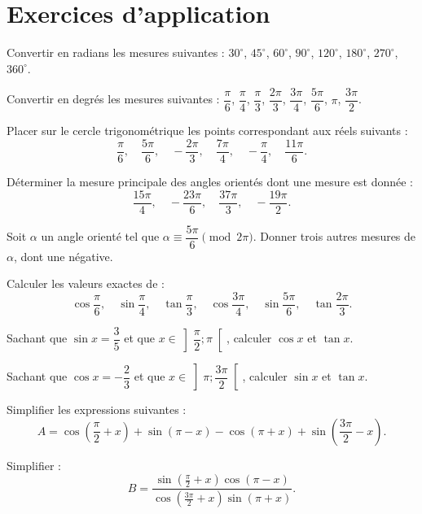 \section{Exercices d'application}


\exo{}
Convertir en radians les mesures suivantes : $30^\circ$, $45^\circ$, $60^\circ$, $90^\circ$, $120^\circ$, $180^\circ$, $270^\circ$, $360^\circ$.

\exo{}
Convertir en degrés les mesures suivantes : $\dfrac{\pi}{6}$, $\dfrac{\pi}{4}$, $\dfrac{\pi}{3}$, $\dfrac{2\pi}{3}$, $\dfrac{3\pi}{4}$, $\dfrac{5\pi}{6}$, $\pi$, $\dfrac{3\pi}{2}$.

\exo{}
Placer sur le cercle trigonométrique les points correspondant aux réels suivants :
\[
\frac{\pi}{6},\quad \frac{5\pi}{6},\quad -\frac{2\pi}{3},\quad \frac{7\pi}{4},\quad -\frac{\pi}{4},\quad \frac{11\pi}{6}.
\]


\exo{}
Déterminer la mesure principale des angles orientés dont une mesure est donnée :
\[
\frac{15\pi}{4},\quad -\frac{23\pi}{6},\quad \frac{37\pi}{3},\quad -\frac{19\pi}{2}.
\]

\exo{}
Soit $\alpha$ un angle orienté tel que $\alpha \equiv \dfrac{5\pi}{6} \pmod{2\pi}$. Donner trois autres mesures de $\alpha$, dont une négative.


\exo{}
Calculer les valeurs exactes de :
\[
\cos\frac{\pi}{6},\quad \sin\frac{\pi}{4},\quad \tan\frac{\pi}{3},\quad \cos\frac{3\pi}{4},\quad \sin\frac{5\pi}{6},\quad \tan\frac{2\pi}{3}.
\]

\exo{}
Sachant que $\sin x = \dfrac{3}{5}$ et que $x \in \left]\dfrac{\pi}{2};\pi\right[$, calculer $\cos x$ et $\tan x$.

\exo{}
Sachant que $\cos x = -\dfrac{2}{3}$ et que $x \in \left]\pi;\dfrac{3\pi}{2}\right[$, calculer $\sin x$ et $\tan x$.


\exo{}
Simplifier les expressions suivantes :
\[
A = \cos\left(\frac{\pi}{2}+x\right) + \sin(\pi-x) - \cos(\pi+x) + \sin\left(\frac{3\pi}{2}-x\right).
\]

\exo{}
Simplifier :
\[
B = \frac{\sin\left(\frac{\pi}{2}+x\right)\cos(\pi-x)}{\cos\left(\frac{3\pi}{2}+x\right)\sin(\pi+x)}.
\]

